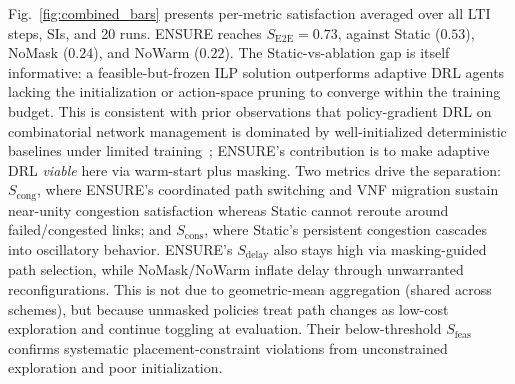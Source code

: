 \documentclass[12pt,lettersize,journal,onecolumn]{IEEEtran}
\newcommand{\subsubsubsection}[1]{\paragraph{#1}}
\begin{document}
Fig.~\ref{fig:combined_bars} presents per-metric satisfaction averaged over all LTI steps, SIs, and 20 runs. ENSURE reaches $S_{\mathrm{E2E}}=0.73$, against Static ($0.53$), NoMask ($0.24$), and NoWarm ($0.22$). The Static-vs-ablation gap is itself informative: a feasible-but-frozen ILP solution outperforms adaptive DRL agents lacking the initialization or action-space pruning to converge within the training budget. This is consistent with prior observations that policy-gradient DRL on combinatorial network management is dominated by well-initialized deterministic baselines under limited training~\cite{marl24albrecht}; ENSURE's contribution is to make adaptive DRL \emph{viable} here via warm-start plus masking. Two metrics drive the separation: $S_{\mathrm{cong}}$, where ENSURE's coordinated path switching and VNF migration sustain near-unity congestion satisfaction whereas Static cannot reroute around failed/congested links; and $S_{\mathrm{cons}}$, where Static's persistent congestion cascades into oscillatory behavior. ENSURE's $S_{\mathrm{delay}}$ also stays high via masking-guided path selection, while NoMask/NoWarm inflate delay through unwarranted reconfigurations. This is not due to geometric-mean aggregation (shared across schemes), but because unmasked policies treat path changes as low-cost exploration and continue toggling at evaluation. Their below-threshold $S_{\mathrm{feas}}$ confirms systematic placement-constraint violations from unconstrained exploration and poor initialization.
\end{document}
